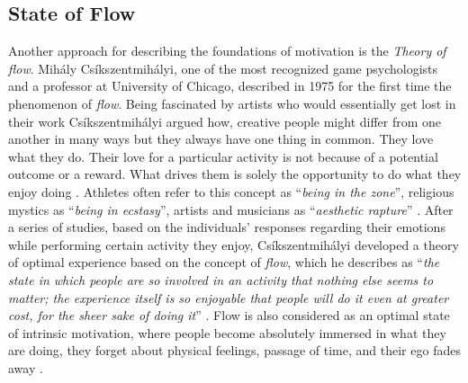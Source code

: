\subsection{State of Flow}
Another approach for describing the foundations of motivation is the \textit{Theory of flow}. Mih\'{a}ly Cs\'{i}kszentmih\'{a}lyi, one of the most recognized game psychologists and a professor at University of Chicago, described in 1975 for the first time the phenomenon of \textit{flow}. Being fascinated by artists who would essentially get lost in their work Cs\'{i}kszentmih\'{a}lyi argued how, creative people might differ from one another in many ways but they always have one thing in common. They love what they do. Their love for a particular activity is not because of a potential outcome or a reward. What drives them is solely the opportunity to do what they enjoy doing \cite{csikszentmihalyi1996flow}. Athletes often refer to this concept as ``\textit{being in the zone}'', religious mystics
as ``\textit{being in ecstasy}'', artists and musicians as ``\textit{aesthetic rapture}'' \cite{csikszentmihalyi1997finding}. After a series of studies, based on the individuals' responses regarding their emotions while performing certain activity they enjoy, Cs\'{i}kszentmih\'{a}lyi  developed a theory of optimal experience based on the concept of \textit{flow}, which he describes as 
``\textit{the state in which people are so involved in an activity that nothing else seems to matter; the experience itself is so enjoyable that people will do it even at greater cost, for the sheer sake of doing it}'' \cite{flow1990psychology}. Flow is also considered as an optimal state of intrinsic motivation, where people become absolutely immersed in what they are doing, they forget about physical feelings, passage of time, and their ego fades away \cite{lithiumGamification}. 
